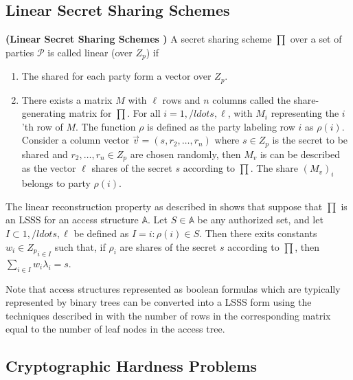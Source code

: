 \subsection{Linear Secret Sharing Schemes}

\begin{definition}{\textbf{(Linear Secret Sharing Schemes \cite{Beimel1996}\cite{Waters2011})}}
	A secret sharing scheme $ \prod $ over a set of parties $ \mathcal{P} $ is called linear (over $ Z_{p} $) if
	\begin{enumerate}
		\item The shared for each party form a vector over $ Z_{p} $.
		
		\item There exists a matrix $ M $ with $ \ell $ rows and $ n $ columns called the share-generating matrix for $ \prod $. For all $ i = 1,/ldots,\ell $, with $ M_{i} $ representing the $i$'th row of $ M $. The function $ \rho $ is defined as the party labeling row $ i $ as $ \rho(i) $. Consider a column vector $ \vec{v} = (s, r_{2},\ldots,r_{n}) $ where $ s \in Z_{p} $ is the secret to be shared and $ r_{2},\ldots,r_{n} \in Z_{p} $ are chosen randomly, then $ M_{v} $ is can be described as the vector $ \ell $ shares of the secret $ s $ according to $ \prod $. The share $ (M_{v})_{i} $ belongs to party $ \rho(i) $.
		
	\end{enumerate}
\end{definition}

The linear reconstruction property as described in \cite{Beimel1996} shows that suppose that $ \prod $ is an LSSS for an access structure $ \mathbb{A} $. Let $ S \in \mathbb{A} $ be any authorized set, and let $ I \subset {1,/ldots,\ell} $ be defined as $ I = {i : \rho(i) \in S} $. Then there exits constants $ {w_{i} \in Z_{p}}_{i \in I} $ such that, if $ {\rho_{i}} $ are shares of the secret $ s $ according to $ \prod $, then $ \sum_{i \in I} w_{i}\lambda_{i} = s $.

Note that access structures represented as boolean formulas which are typically represented by binary trees can be converted into a LSSS form using the techniques described in \cite{Lewko2011b} with the number of rows in the corresponding matrix equal to the number of leaf nodes in the access tree.


\subsection{Cryptographic Hardness Problems}

